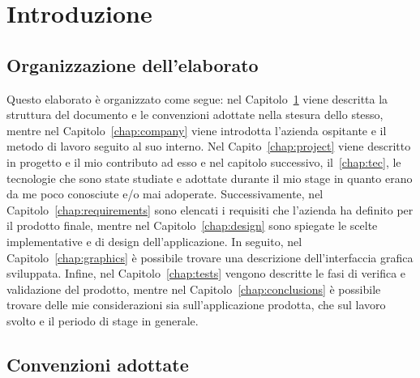 \mainmatter

\chapter{Introduzione}\label{chap:intro}

\section{Organizzazione dell'elaborato}
Questo elaborato è organizzato come segue: nel Capitolo~\ref{chap:intro} viene
descritta la struttura del documento e le convenzioni adottate nella stesura
dello stesso, mentre nel Capitolo~\ref{chap:company} viene introdotta l'azienda
ospitante e il metodo di lavoro seguito al suo interno. Nel
Capito~\ref{chap:project} viene descritto in progetto e il mio contributo ad
esso e nel capitolo successivo, il~\ref{chap:tec}, le tecnologie che sono state
studiate e adottate durante il mio stage in quanto erano da me poco conosciute 
e/o mai adoperate. Successivamente, nel
Capitolo~\ref{chap:requirements} sono elencati i requisiti che l'azienda ha
definito per il prodotto finale, mentre nel Capitolo~\ref{chap:design} sono
spiegate le scelte implementative e di design dell'applicazione. In seguito, nel
Capitolo~\ref{chap:graphics} è possibile trovare una descrizione
dell'interfaccia grafica sviluppata. Infine, nel Capitolo~\ref{chap:tests}
vengono descritte le fasi di verifica e validazione del prodotto, mentre nel
Capitolo~\ref{chap:conclusions} è possibile trovare delle mie considerazioni
sia sull'applicazione prodotta, che sul lavoro svolto e il periodo di stage in
generale.

\section{Convenzioni adottate}
